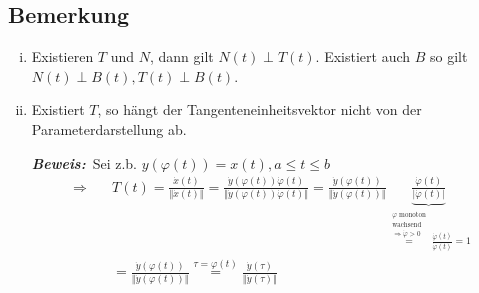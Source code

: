 \documentclass[11pt,a4paper]{book}
\newcommand{\1}    	{\mathbbm{1}}
\newcommand{\Beweis}[1][Beweis]
{\begin{mdframed}[backgroundcolor=gray!10,linewidth=0pt]\noindent\textit{\textbf{{#1}:}}~}
\newcommand{\QED}	{\end{mdframed}}
\begin{document}
\subsection{Bemerkung}
\begin{enumerate}[(i)]
	\item Existieren \(T\) und \(N\), dann gilt \(N(t) \perp T(t)\). Existiert auch \(B\) so gilt \(N(t) \perp B(t), T(t) \perp B(t)\).
	\item Existiert \(T\), so hängt der Tangenteneinheitsvektor nicht von der Parameterdarstellung ab.
	\Beweis Sei z.b. \(y(\varphi(t)) = x(t), a \leqslant t \leqslant b\)
	\begin{align*}
		\Rightarrow\quad & T(t) = 
		\frac{\dot{x}(t)}{\Vert \dot{x}(t) \Vert} = 
		\frac{\dot{y}(\varphi(t))\dot{\varphi}(t)}{\Vert \dot{y}(\varphi(t))\dot{\varphi}(t) \Vert} = 
		\frac{\dot{y}(\varphi(t))}{\Vert \dot{y}(\varphi(t)) \Vert} 
		\underbrace{
			\frac{\dot{\varphi}(t)}{\vert \dot{\varphi}(t) \vert }
		}_{
			\stackrel{\substack{
				\varphi \textrm{ monoton}\\
				\textrm{wachsend}\\
				\Rightarrow \dot{\varphi} > 0
			}}{=} \frac{\dot{\varphi}(t)}{\dot{\varphi}(t)} = 1
		} \\
		&= \frac{\dot{y}(\varphi(t))}{\Vert \dot{y}(\varphi(t)) \Vert}
		\stackrel{\tau = \varphi(t)}{=}
		\frac{\dot{y}(\tau)}{\Vert \dot{y}(\tau) \Vert}
	\end{align*} \QED
\end{enumerate}
\end{document}
